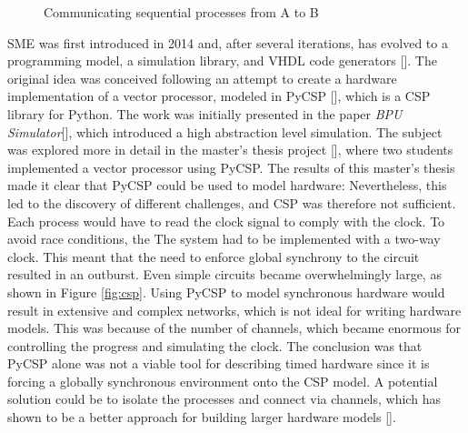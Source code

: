 \begin{figure}
  \centering
    \caption{Communicating sequential processes from A to B }
    \label{fig:AB}
\end{figure}


SME was first introduced in 2014 and, after several iterations, has evolved to a programming model, a simulation library, and VHDL code generators [\cite{vinter2014synchronous}]. The original idea was conceived following an attempt to create a hardware implementation of a vector processor, modeled in PyCSP [\cite{CSP}], which is a CSP library for Python. The work was initially presented in the paper \textit{BPU Simulator}[\cite{Rehr13}], which introduced a high abstraction level simulation. The subject was explored more in detail in the master's thesis project [\cite{skaarup2014generation}], where two students implemented a vector processor using PyCSP. The results of this master's thesis made it clear that PyCSP could be used to model hardware: Nevertheless, this led to the discovery of different challenges, and CSP was therefore not sufficient.
Each process would have to read the clock signal to comply with the clock. To avoid race conditions, the
The system had to be implemented with a two-way clock.
This meant that the need to enforce global synchrony to the circuit resulted in an outburst. Even simple circuits became overwhelmingly large, as shown in Figure \ref{fig:csp}. Using PyCSP to model synchronous hardware would result in extensive and complex networks, which is not ideal for writing hardware models. This was because of the number of channels, which became enormous for controlling the progress and simulating the clock.
The conclusion was that PyCSP alone was not a viable tool for describing timed hardware since it is forcing a globally synchronous environment onto the
CSP model. A potential solution could be to isolate the processes and connect via channels, which has shown to be a better approach for building larger hardware models [\cite{vinter2014synchronous}].

